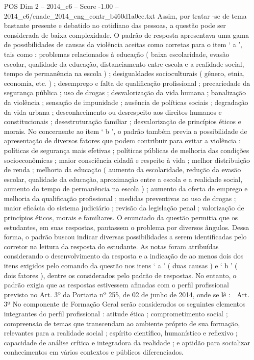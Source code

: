 \begin{textsample}{POS Dim 2 – 2014\_c6 – Score -1.00 – 2014\_c6/enade\_2014\_eng\_contr\_b460d1a0ee.txt}
Assim, por tratar -se de tema bastante presente e debatido no cotidiano das pessoas, a questão pode ser considerada de baixa complexidade.
O padrão de resposta apresentava uma gama de possibilidades de causas da violência aceitas como corretas para o item ‘ a ’, tais como : problemas relacionados à educação ( baixa escolaridade, evasão escolar, qualidade da educação, distanciamento entre escola e a realidade social, tempo de permanência na escola ) ; desigualdades socioculturais ( gênero, etnia, economia, etc. ) ; desemprego e falta de qualificação profissional ; precariedade da segurança pública ; uso de drogas ; desvalorização da vida humana ; banalização da violência ; sensação de impunidade ; ausência de políticas sociais ; degradação da vida urbana ; desconhecimento ou desrespeito aos direitos humanos e constitucionais ; desestruturação familiar ; desvalorização de princípios éticos e morais.
No concernente ao item ‘ b ’, o padrão também previa a possibilidade de apresentação de diversos fatores que podem contribuir para evitar a violência : políticas de segurança mais efetivas ; políticas públicas de melhoria das condições socioeconômicas ; maior consciência cidadã e respeito à vida ; melhor distribuição de renda ; melhoria da educação ( aumento da escolaridade, redução da evasão escolar, qualidade da educação, aproximação entre a escola e a realidade social, aumento do tempo de permanência na escola ) ; aumento da oferta de emprego e melhoria da qualificação profissional ; medidas preventivas ao uso de drogas ; maior eficácia do sistema judiciário ; revisão da legislação penal ; valorização de princípios éticos, morais e familiares.
O enunciado da questão permitia que os estudantes, em suas respostas, pautassem o problema por diversos ângulos.
Dessa forma, o padrão buscou indicar diversas possibilidades a serem identificadas pelo corretor na leitura da resposta do estudante.
As notas foram atribuídas considerando o desenvolvimento da resposta e a indicação de ao menos dois dos itens exigidos pelo comando da questão nos itens ‘ a ’ ( duas causas ) e ‘ b ’ ( dois fatores ), dentre os considerados pelo padrão de respostas.
No entanto, o padrão exigia que as respostas estivessem afinadas com o perfil profissional previsto no Art. 3º da Portaria nº 255, de 02 de junho de 2014, onde se lê :  Art. 3º No componente de Formação Geral serão considerados os seguintes elementos integrantes do perfil profissional : atitude ética ; comprometimento social ; compreensão de temas que transcendam ao ambiente próprio de sua formação, relevantes para a realidade social ; espírito científico, humanístico e reflexivo ; capacidade de análise crítica e integradora da realidade ; e aptidão para socializar conhecimentos em vários contextos e públicos diferenciados.

\end{textsample}
